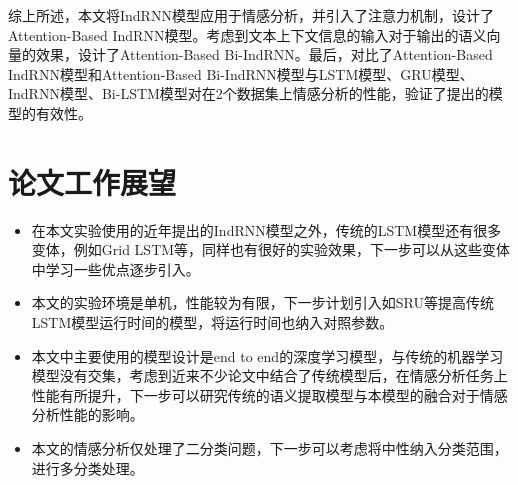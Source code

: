 \documentclass[a4paper,AutoFakeBold,oneside,12pt]{book}
\begin{document}
综上所述，本文将IndRNN模型应用于情感分析，并引入了注意力机制，设计了Attention-Based IndRNN模型。考虑到文本上下文信息的输入对于输出的语义向量的效果，设计了Attention-Based Bi-IndRNN。最后，对比了Attention-Based IndRNN模型和Attention-Based Bi-IndRNN模型与LSTM模型、GRU模型、IndRNN模型、Bi-LSTM模型对在2个数据集上情感分析的性能，验证了提出的模型的有效性。

\section{论文工作展望}

\begin{itemize}
    \item 在本文实验使用的近年提出的IndRNN模型之外，传统的LSTM模型还有很多变体，例如Grid LSTM等，同样也有很好的实验效果，下一步可以从这些变体中学习一些优点逐步引入。
    \item 本文的实验环境是单机，性能较为有限，下一步计划引入如SRU等提高传统LSTM模型运行时间的模型，将运行时间也纳入对照参数。
    \item 本文中主要使用的模型设计是end to end的深度学习模型，与传统的机器学习模型没有交集，考虑到近来不少论文中结合了传统模型后，在情感分析任务上性能有所提升，下一步可以研究传统的语义提取模型与本模型的融合对于情感分析性能的影响。
    \item 本文的情感分析仅处理了二分类问题，下一步可以考虑将中性纳入分类范围，进行多分类处理。
\end{itemize}
\end{document}

